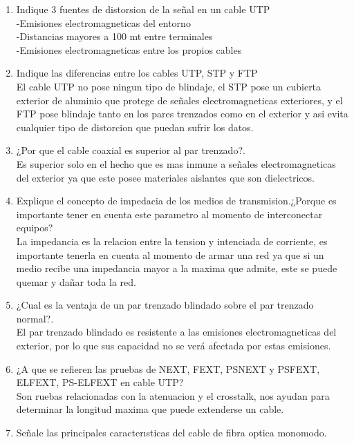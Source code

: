 \documentclass{udparticle}
\begin{document}
\begin{enumerate}
    \item Indique 3 fuentes de distorsion de la señal en un cable UTP\\
    -Emisiones electromagneticas del entorno\\
    -Distancias mayores a 100 mt entre terminales\\
    -Emisiones electromagneticas entre los propios cables\\
    \item Indique las diferencias entre los cables UTP, STP y FTP\\
    El cable UTP no pose ningun tipo de blindaje, el STP pose un cubierta exterior de aluminio que protege de señales 
    electromagneticas exteriores, y el FTP pose blindaje tanto en los pares trenzados como en el exterior y asi evita cualquier tipo 
    de distorcion que puedan sufrir los datos.\\
    \item  ¿Por que el cable coaxial es superior al par trenzado?.\\
    Es superior solo en el hecho que es mas inmune a señales electromagneticas del exterior ya que este posee materiales aislantes 
    que son dielectricos.\\
    \item Explique el concepto de impedacia de los medios de transmision.¿Porque es importante tener en cuenta este parametro al momento de interconectar equipos? \\
    La impedancia es la relacion entre la tension y intenciada de corriente, es importante tenerla en cuenta al momento de armar una red ya que si un medio recibe una impedancia mayor a la maxima que admite, este se puede quemar y dañar toda la red.\\
    \item ¿Cual es la ventaja de un par trenzado blindado sobre el par trenzado normal?.\\
    El par trenzado blindado es resistente a las emisiones electromagneticas del exterior, por lo que sus capacidad no se verá 
    afectada por estas emisiones.\\
    \item ¿A que se reﬁeren las pruebas de NEXT, FEXT, PSNEXT y PSFEXT, ELFEXT, PS-ELFEXT en cable UTP?\\
    Son ruebas relacionadas con la atenuacion y el crosstalk, nos ayudan para determinar la longitud maxima que puede extenderse un cable.\\
  \item Señale las principales caracterısticas del cable de ﬁbra optica monomodo.\\

\end{enumerate}
\end{document}
